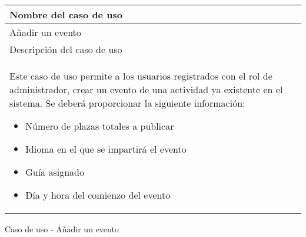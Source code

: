\begin{identificacionCasoDeUso}
	\begin{tabular} { | p{17cm} |}
		\hline
		Nombre del caso de uso                       \\ \hline
		Añadir un evento                             \\ \hline
		Descripción del caso de uso                  \\ \hline
		Este caso de uso permite a los usuarios registrados con el rol de administrador, crear un evento de una actividad ya existente en el sistema. Se deberá proporcionar la siguiente información:
		\begin{itemize}
			\item Número de plazas totales a publicar
			\item Idioma en el que se impartirá el evento
			\item Guía asignado
			\item Día y hora del comienzo del evento
		\end{itemize} \\ \hline
	\end{tabular}
	\caption{Caso de uso - Añadir un evento}
\end{identificacionCasoDeUso}